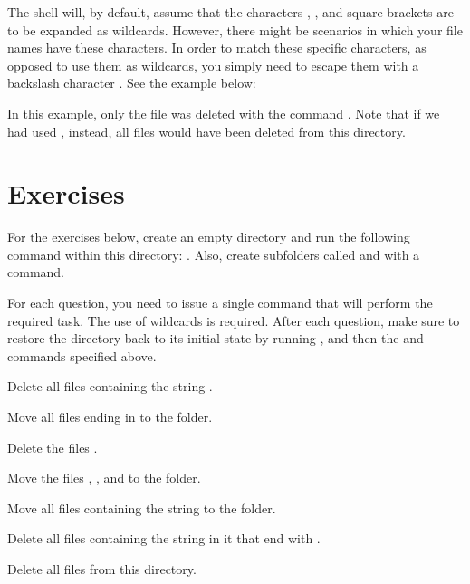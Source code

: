 The shell will, by default, assume that the characters \mycommand{*}, , and square brackets \mycommand{{[}{]}} are to be expanded as wildcards. However, there might be scenarios in which your file names have these characters. In order to match these specific characters, as opposed to use them as wildcards, you simply need to escape them with a backslash character \mycommand{\textbackslash}. See the example below:
In this example, only the file  was deleted with the command . Note that if we had used , instead, all files would have been deleted from this directory.

\section*{Exercises}

For the exercises below, create an empty directory and run the following command within this directory:              . Also, create subfolders called  and  with a  command.

For each question, you need to issue a single command that will perform the required task. The use of wildcards is required. After each question, make sure to restore the directory back to its initial state by running , and then the  and  commands specified above.

\begin{exercises}
  \item Delete all files containing the string .
  \item Move all files ending in  to the  folder.
  \item Delete the files  .
  \item Move the files , , and  to the  folder.
  \item Move all files containing the string  to the  folder.
  \item Delete all files containing the string  in it that end with .
  \item Delete all files from this directory.
\end{exercises}
